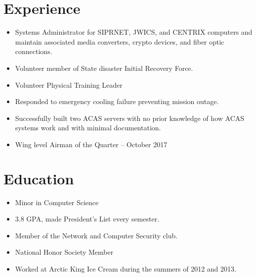 \documentclass[11pt]{resume}
\author{Seth Sevier}
\begin{document}
\maketitle

\section{Experience}

\begin{itemize}
\item Systems Administrator for SIPRNET, JWICS, and CENTRIX computers and maintain associated media converters, crypto devices, and fiber optic connections.
\item Volunteer member of State disaster Initial Recovery Force.
\item Volunteer Physical Training Leader
\item Responded to emergency cooling failure preventing mission outage.
\item Successfully built two ACAS servers with no prior knowledge of how ACAS systems work and with minimal documentation.
\item Wing level Airman of the Quarter -- October 2017
\end{itemize}

\section{Education}
\begin{itemize}
\item Minor in Computer Science
\item 3.8 GPA, made President's List every semester.
\item Member of the Network and Computer Security club.
\end{itemize}



\begin{itemize}
\item National Honor Society Member
\item Worked at Arctic King Ice Cream during the summers of 2012 and 2013.
\end{itemize}
\end{document}
